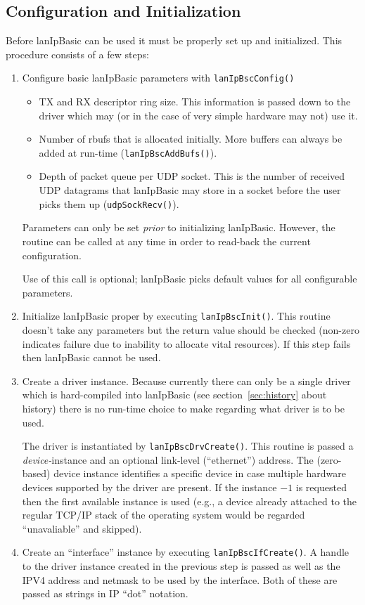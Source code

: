 \documentclass{article}
\newcommand{\lip}{lanIpBasic}
\newcommand{\rbuf}{{rbuf}}
\newcommand{\lipc}[1]{{\tt #1}}
\begin{document}
  \subsection{Configuration and Initialization}
Before \lip{} can be used it must be properly set up and initialized.
This procedure consists of a few steps:
\begin{enumerate}
\item Configure basic \lip{} parameters with \lipc{lanIpBscConfig()}
  \begin{itemize}
    \item TX and RX descriptor ring size. This information is passed
          down to the driver which may (or in the case of very simple
          hardware may not) use it.
    \item Number of \rbuf{}s that is allocated initially. More buffers
          can always be added at run-time (\lipc{lanIpBscAddBufs()}).
    \item Depth of packet queue per UDP socket. This is the number
          of received UDP datagrams that \lip{} may store in a socket
          before the user picks them up (\lipc{udpSockRecv()}).
  \end{itemize}

  Parameters can only be set {\em prior} to initializing \lip{}.
  However, the routine can be called at any time in order to
  read-back the current configuration.

  Use of this call is optional; \lip{} picks default values for
  all configurable parameters.
\item Initialize \lip{} proper by executing \lipc{lanIpBscInit()}.
  This routine doesn't take any parameters but the return value
  should be checked (non-zero indicates failure due to inability
  to allocate vital resources). If this step fails then \lip{} cannot
  be used.
\item Create a driver instance. Because currently there can only be
  a single driver which is hard-compiled into \lip{} (see
  section~\ref{sec:history} about history) there is no run-time
  choice to make regarding what driver is to be used.

  The driver is instantiated by \lipc{lanIpBscDrvCreate()}. This
  routine is passed a {\em device-}instance and an optional link-level
  (``ethernet'') address. The (zero-based) device instance identifies 
  a specific device in case multiple hardware devices supported by
  the driver are present. If the instance $-1$ is requested then the
  first available instance is used (e.g., a device already attached
  to the regular TCP/IP stack of the operating system would be
  regarded ``unavaliable'' and skipped).
\item Create an ``interface'' instance by executing \lipc{lanIpBscIfCreate()}.
  A handle to the driver instance created in the previous step is passed
  as well as the IPV4 address and netmask to be used by the interface.
  Both of these are passed as strings in IP ``dot'' notation.
\end{enumerate}
\end{document}
